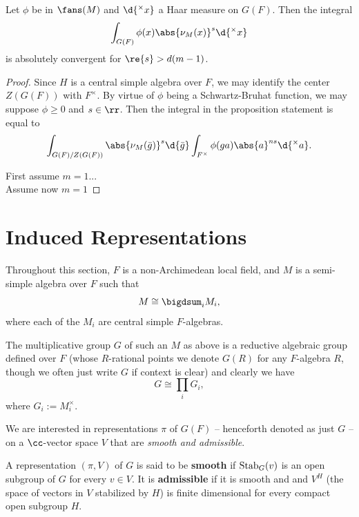 \documentclass[11pt, x11names, openany]{book}
\begin{document}
\begin{prop}
Let $\phi$ be in $\fans(M)$ and $\d{^\times x}$ a Haar measure on $G(F)$. Then the integral
\begin{equation*}
    \int_{G(F)}\phi(x) \abs{\nu_M(x)}^s \d{^\times x}
\end{equation*}
is absolutely convergent for $\re{s} > d(m-1)$.
\end{prop}
\begin{proof}
Since $H$ is a central simple algebra over $F$, we may identify the center $Z(G(F))$ with $F^\times$. By virtue of $\phi$ being a Schwartz-Bruhat function, we may suppose $\phi \geq 0$ and $s \in \rr$. Then the integral in the proposition statement is equal to
\begin{equation*}
    \int_{G(F)/Z(G(F))} \abs{\nu_M(\bar{g})}^s \d{\bar{g}} \int_{F^\times} \phi(ga) \abs{a}^{ns} \d{^\times a}.
\end{equation*}

First assume $m = 1$...\\

Assume now $m = 1$
\end{proof}



\section{Induced Representations}

Throughout this section, $F$ is a non-Archimedean local field, and $M$ is a semi-simple algebra over $F$ such that
\begin{equation*}
  M \cong \bigdsum_i M_i,
\end{equation*}
where each of the $M_i$ are central simple $F$-algebras.

The multiplicative group $G$ of such an $M$ as above is a reductive algebraic group defined over $F$ (whose $R$-rational points we denote $G(R)$ for any $F$-algebra $R$, though we often just write $G$ if context is clear) and clearly we have
\begin{equation}
  G \cong \prod_i G_i,
\end{equation}
where $G_i := M_i^\times$. 

We are interested in representations $\pi$ of $G(F)$ -- henceforth denoted as just $G$ -- on a $\cc$-vector space $V$ that are \textit{smooth and admissible}.
\begin{defn}
  \label{def: smooth and admissible repns}
  A representation $(\pi, V)$ of $G$ is said to be \textbf{smooth} if $\operatorname{Stab}_G(v)$ is an open subgroup of $G$ for every $v \in V$. It is \textbf{admissible} if it is smooth and and $V^{H}$ (the space of vectors in $V$ stabilized by $H$) is finite dimensional for every compact open subgroup $H$.
\end{defn}
\end{document}
